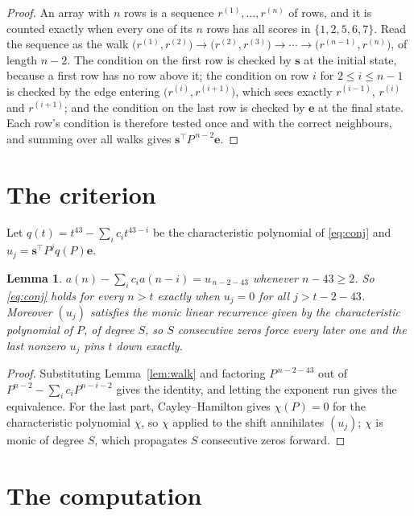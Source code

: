 \documentclass[11pt,a4paper]{article}
\theoremstyle{plain}
\newtheorem{lemma}[theorem]{Lemma}
\theoremstyle{definition}
\begin{document}
\begin{proof}
An array with $n$ rows is a sequence $r^{(1)},\dots,r^{(n)}$ of rows, and it is counted
exactly when every one of its $n$ rows has all scores in $\{1,2,5,6,7\}$. Read the sequence as the
walk $\bigl(r^{(1)},r^{(2)}\bigr)\to\bigl(r^{(2)},r^{(3)}\bigr)\to\cdots\to
\bigl(r^{(n-1)},r^{(n)}\bigr)$, of length $n-2$. The condition on the first row is
checked by $\mathbf{s}$ at the initial state, because a first row has no row above it; the
condition on row $i$ for $2\le i\le n-1$ is checked by the edge entering
$\bigl(r^{(i)},r^{(i+1)}\bigr)$, which sees exactly $r^{(i-1)}$, $r^{(i)}$ and
$r^{(i+1)}$; and the condition on the last row is checked by $\mathbf{e}$ at the final
state. Each row's condition is therefore tested once and with the correct neighbours, and
summing over all walks gives $\mathbf{s}^{\!\top}P^{\,n-2}\mathbf{e}$.
\end{proof}

\section{The criterion}

Let $q(t)=t^{43}-\sum_i c_i t^{43-i}$ be the characteristic polynomial of
\eqref{eq:conj} and $u_j=\mathbf{s}^{\!\top}P^{j}q(P)\mathbf{e}$.

\begin{lemma}\label{lem:crit}
$a(n)-\sum_i c_i a(n-i)=u_{\,n-2-43}$ whenever $n-43\ge2$. So \eqref{eq:conj}
holds for every $n>t$ exactly when $u_j=0$ for all $j>t-2-43$. Moreover $(u_j)$
satisfies the monic linear recurrence given by the characteristic polynomial of $P$, of
degree $S$, so $S$ consecutive zeros force every later one and the last nonzero $u_j$ pins
$t$ down exactly.
\end{lemma}

\begin{proof}
Substituting Lemma~\ref{lem:walk} and factoring $P^{\,n-2-43}$ out of
$P^{n-2}-\sum_i c_i P^{n-i-2}$ gives the identity, and letting the exponent run gives the
equivalence. For the last part, Cayley--Hamilton gives $\chi(P)=0$ for the characteristic
polynomial $\chi$, so $\chi$ applied to the shift annihilates $(u_j)$; $\chi$ is monic of
degree $S$, which propagates $S$ consecutive zeros forward.
\end{proof}

\section{The computation}
\end{document}
